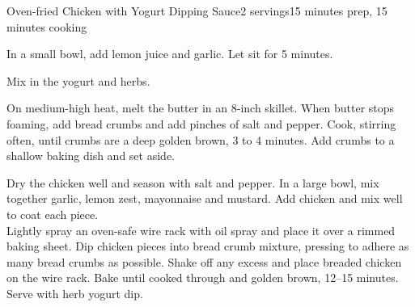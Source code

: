 \documentclass[../Cookbook.tex]{subfiles}
\begin{document}
\begin{recipe}{Oven-fried Chicken with Yogurt Dipping Sauce}{2 servings}{15 minutes prep, 15 minutes cooking}


In a small bowl, add lemon juice and garlic. Let sit for 5 minutes.

Mix in the yogurt and herbs.

On medium-high heat, melt the butter in an 8-inch skillet. When butter stops foaming, add bread crumbs and add pinches of salt and pepper. Cook, stirring often, until crumbs are a deep golden brown, 3 to 4 minutes. Add crumbs to a shallow baking dish and set aside.

Dry the chicken well and season with salt and pepper. In a large bowl, mix together garlic, lemon zest, mayonnaise and mustard. Add chicken and mix well to coat each piece.\\
Lightly spray an oven-safe wire rack with oil spray and place it over a rimmed baking sheet. Dip chicken pieces into bread crumb mixture, pressing to adhere as many bread crumbs as possible. Shake off any excess and place breaded chicken on the wire rack. Bake until cooked through and golden brown, 12--15 minutes. Serve with herb yogurt dip.


\end{recipe}
\end{document}
